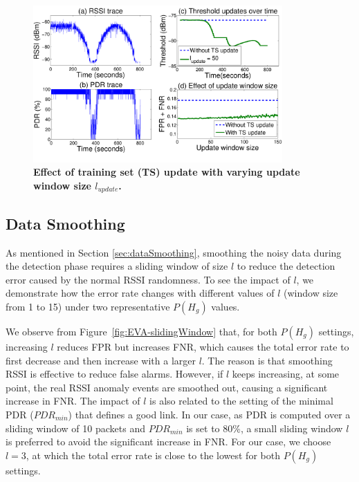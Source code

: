\begin{figure}[t]
	\centering
	\includegraphics[width=1.0\linewidth, height = 6cm]{6-Find_UpdateWindowSize-WithPerson-nonLoS-UpDownUpDown-L1R1-2}
	\vspace{-1cm}
	\caption{\textbf{Effect of training set (TS) update with varying update window size $l_{update}$.}}
	\label{fig:EVA-updateWindow}
	\vspace{-0.7cm}
\end{figure} 

\subsection{Data Smoothing} \label{sec:ImpactDataSmoothing}

As mentioned in Section \ref{sec:dataSmoothing}, smoothing the noisy data during the detection phase requires a sliding window of size $l$ to reduce the detection error caused by the normal RSSI randomness. To see the impact of $l$, we demonstrate how the error rate changes with different values of $l$ (window size from 1 to 15) under two representative $P(H_g)$ values.

We observe from Figure~\ref{fig:EVA-slidingWindow} that, for both $P(H_g)$ settings, increasing $l$ reduces FPR but increases FNR, which causes the total error rate to first decrease and then increase with a larger $l$. The reason is that smoothing RSSI is effective to reduce false alarms. However, if $l$ keeps increasing, at some point, the real RSSI anomaly events are smoothed out, causing a significant increase in FNR. The impact of $l$ is also related to the setting of the minimal PDR ($PDR_{min}$) that defines a good link. In our case, as PDR is computed over a sliding window of 10 packets and $PDR_{min}$ is set to 80\%, a small sliding window $l$ is preferred to avoid the significant increase in FNR. For our case, we choose $l = 3$, at which the total error rate is close to the lowest for both $P(H_g)$ settings.  



